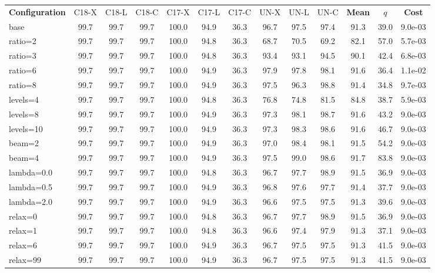 \begin{tabular}{@{}lcccccccccccc@{}}
\toprule
\textbf{Configuration} & C18-X & C18-L & C18-C & C17-X & C17-L & C17-C & UN-X & UN-L & UN-C & \textbf{Mean} & \textbf{$q$} & \textbf{Cost} \\
base & 99.7 & 99.7 & 99.7 & 100.0 & 94.9 & 36.3 & 96.7 & 97.5 & 97.4 & 91.3 & 39.0 & 9.0e-03 \\
ratio{=}2 & 99.7 & 99.7 & 99.7 & 100.0 & 94.8 & 36.3 & 68.7 & 70.5 & 69.2 & 82.1 & 57.0 & 5.7e-03 \\
ratio{=}3 & 99.7 & 99.7 & 99.7 & 100.0 & 94.8 & 36.3 & 93.4 & 93.1 & 94.5 & 90.1 & 42.4 & 6.8e-03 \\
ratio{=}6 & 99.7 & 99.7 & 99.7 & 100.0 & 94.9 & 36.3 & 97.9 & 97.8 & 98.1 & 91.6 & 36.4 & 1.1e-02 \\
ratio{=}8 & 99.7 & 99.7 & 99.7 & 100.0 & 94.9 & 36.3 & 97.5 & 96.3 & 98.8 & 91.4 & 34.8 & 9.7e-03 \\
levels{=}4 & 99.7 & 99.7 & 99.7 & 100.0 & 94.8 & 36.3 & 76.8 & 74.8 & 81.5 & 84.8 & 38.7 & 5.9e-03 \\
levels{=}8 & 99.7 & 99.7 & 99.7 & 100.0 & 94.9 & 36.3 & 97.3 & 98.1 & 98.7 & 91.6 & 43.2 & 9.0e-03 \\
levels{=}10 & 99.7 & 99.7 & 99.7 & 100.0 & 94.9 & 36.3 & 97.3 & 98.3 & 98.6 & 91.6 & 46.7 & 9.0e-03 \\
beam{=}2 & 99.7 & 99.7 & 99.7 & 100.0 & 94.9 & 36.3 & 97.0 & 98.4 & 98.1 & 91.5 & 54.2 & 9.0e-03 \\
beam{=}4 & 99.7 & 99.7 & 99.7 & 100.0 & 94.9 & 36.3 & 97.5 & 99.0 & 98.6 & 91.7 & 83.8 & 9.0e-03 \\
lambda{=}0.0 & 99.7 & 99.7 & 99.7 & 100.0 & 94.8 & 36.3 & 96.7 & 97.7 & 98.9 & 91.5 & 36.9 & 9.0e-03 \\
lambda{=}0.5 & 99.7 & 99.7 & 99.7 & 100.0 & 94.9 & 36.3 & 96.8 & 97.6 & 97.7 & 91.4 & 37.7 & 9.0e-03 \\
lambda{=}2.0 & 99.7 & 99.7 & 99.7 & 100.0 & 94.9 & 36.3 & 96.6 & 97.5 & 97.5 & 91.3 & 39.6 & 9.0e-03 \\
relax{=}0 & 99.7 & 99.7 & 99.7 & 100.0 & 94.8 & 36.3 & 96.7 & 97.7 & 98.9 & 91.5 & 36.9 & 9.0e-03 \\
relax{=}1 & 99.7 & 99.7 & 99.7 & 100.0 & 94.8 & 36.3 & 96.6 & 97.4 & 97.9 & 91.3 & 37.1 & 9.0e-03 \\
relax{=}6 & 99.7 & 99.7 & 99.7 & 100.0 & 94.9 & 36.3 & 96.7 & 97.5 & 97.5 & 91.3 & 41.5 & 9.0e-03 \\
relax{=}99 & 99.7 & 99.7 & 99.7 & 100.0 & 94.9 & 36.3 & 96.7 & 97.5 & 97.5 & 91.3 & 41.5 & 9.0e-03 \\

\end{tabular}
